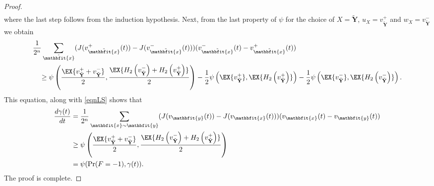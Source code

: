 \documentclass[conference,letterpaper,onecolumn]{IEEEtran}
\theoremstyle{plain}%
\newcommand{\bY}{\mathbf{Y}}
\newcommand{\by}{\mathbfit{y}}
\newcommand{\bx}{\mathbfit{x}}
\begin{document}
\begin{proof}
{\begin{align}
    \end{align}}
    where the last step follows from the induction hypothesis. Next, from the last property of $\psi$ for the choice of $X=\tilde{\bY}$,
$u_X=v^+_{\tilde{\bY}}$
and
$w_X=v^-_{\tilde{\bY}}$ we obtain
    \begin{align*}
        &\frac{1}{2^n}\sum_{\Tilde{\bx}}(J(v^+_{\Tilde{\bx}}(t)) - J(v^-_{\Tilde{\bx}}(t)))(v^-_{\Tilde{\bx}}(t) - v^+_{\Tilde{\bx}}(t)) \\
        &\quad\geq \psi\left(\frac{\EX{v^+_{\Tilde{\bY}}+v^-_{\Tilde{\bY}}}}{2},\frac{\EX{H_2\left(v^-_{\Tilde{\bY}}\right)+H_2\left(v^+_{\Tilde{\bY}}\right)}}{2}\right) 
         -\frac{1}{2}\psi\left(\EX{v^+_{\Tilde{\bY}}},\EX{H_2\left(v^+_{\Tilde{\bY}}\right)}\right)- \frac{1}{2}\psi\left(\EX{v^-_{\Tilde{\bY}}},\EX{H_2\left(v^-_{\Tilde{\bY}}\right)}\right). 
    \end{align*}
    This equation, along with \eqref{eqnLS} shows that
   \begin{align}
    \nonumber
        \frac{d\gamma(t)}{dt} &= \frac{1}{2^n}\sum_{\bx\sim \by}(J(v_\by(t)) - J(v_\bx(t)))(v_\bx(t) - v_\by(t))
        \\&\geq 
        \psi\left(\frac{\EX{v^+_{\Tilde{\bY}}+v^-_{\Tilde{\bY}}}}{2},\frac{\EX{H_2\left(v^-_{\Tilde{\bY}}\right)+H_2\left(v^+_{\Tilde{\bY}}\right)}}{2}\right)  
        \\&=\psi(\textnormal{Pr}(F = -1),\gamma(t)).
        \end{align}
The proof is complete.
\end{proof}

\end{document}
